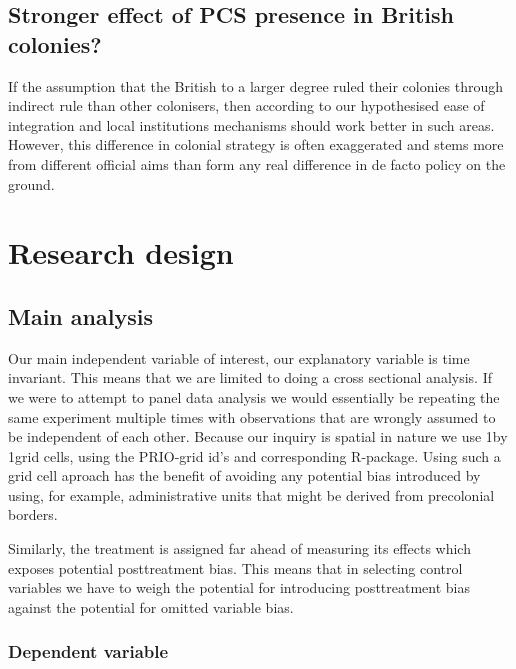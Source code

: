 \documentclass[12pt]{article}
\begin{document}


\subsection{Stronger effect of PCS presence in British colonies?}

If the assumption that the British to a larger degree ruled their colonies
through indirect rule than other colonisers, then according to our hypothesised
ease of integration and local institutions mechanisms should work better in such
areas. However, this difference in colonial strategy is often exaggerated and
stems more from different official aims than form any real difference in de
facto policy on the ground.

\section{Research design}
\subsection{Main analysis}
 
Our main independent variable of interest, our explanatory variable
is time invariant. This means that we are limited to doing a cross sectional
analysis. If we were to attempt to panel data analysis we would essentially be repeating the
same experiment multiple times with observations that are wrongly assumed to be
independent of each other. 
Because our inquiry is spatial in nature we use 1\degree by 1\degree grid cells,
using the PRIO-grid id's and corresponding R-package. Using such a grid cell
aproach has the benefit of avoiding any potential bias introduced by using, for
example, administrative units that might be derived from precolonial borders.

Similarly, the treatment is assigned far ahead of measuring its effects which
exposes potential posttreatment bias. This means that in selecting control
variables we have to weigh the potential for introducing posttreatment bias
against the potential for omitted variable bias.

\subsubsection{Dependent variable}
\end{document}
